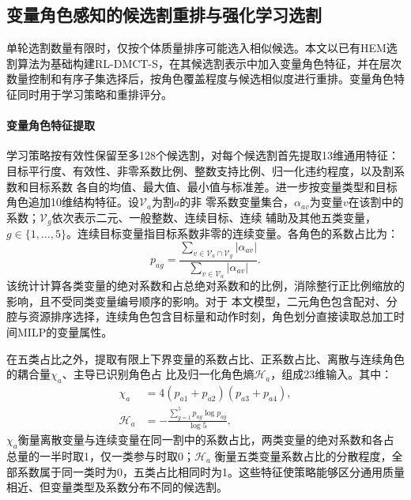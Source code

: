 \documentclass[final,5p,times,twocolumn]{elsarticle}
\begin{document}
\subsection{变量角色感知的候选割重排与强化学习选割}
\label{sec:hem-extension-cn}

单轮选割数量有限时，仅按个体质量排序可能选入相似候选。本文以已有HEM选割算法\citep{wang2023hem}为基础构建RL-DMCT-S，在其候选割表示中加入变量角色特征，并在层次数量控制和有序子集选择后，按角色覆盖程度与候选相似度进行重排。变量角色特征同时用于学习策略和重排评分。

\paragraph{变量角色特征提取}
学习策略按有效性保留至多128个候选割，对每个候选割首先提取13维通用特征：目标平行度、有效性、非零系数比例、整数支持比例、归一化违约程度，以及割系数和目标系数
各自的均值、最大值、最小值与标准差。进一步按变量类型和目标角色追加10维结构特征。设$\mathcal V_a$为割$a$的非
零系数变量集合，$\alpha_{av}$为变量$v$在该割中的系数；$\mathcal V_g$依次表示二元、一般整数、连续目标、连续
辅助及其他五类变量，$g\in\{1,\ldots,5\}$。连续目标变量指目标系数非零的连续变量。各角色的系数占比为：
\begin{equation}
p_{ag}=\frac{\sum_{v\in\mathcal V_a\cap\mathcal V_g}|\alpha_{av}|}
{\sum_{v\in\mathcal V_a}|\alpha_{av}|}.
\label{eq:role-profile-cn}
\end{equation}
该统计计算各类变量的绝对系数和占总绝对系数和的比例，消除整行正比例缩放的影响，且不受同类变量编号顺序的影响。对于
本文模型，二元角色包含配对、分腔与资源排序选择，连续角色包含目标量和动作时刻，角色划分直接读取总加工时间MILP的变量属性。

在五类占比之外，提取有限上下界变量的系数占比、正系数占比、离散与连续角色的耦合量$\chi_a$、主导已识别角色占
比及归一化角色熵$\mathcal H_a$，组成23维输入。其中：
\begin{equation}
\begin{aligned}
\chi_a&=4(p_{a1}+p_{a2})(p_{a3}+p_{a4}),\\
\mathcal H_a&=-\frac{\sum_{g=1}^{5}p_{ag}\log p_{ag}}{\log5}.
\end{aligned}
\label{eq:role-information-cn}
\end{equation}
$\chi_a$衡量离散变量与连续变量在同一割中的系数占比，两类变量的绝对系数和各占总量的一半时取1，仅一类参与时取0；$\mathcal H_a$
衡量五类变量系数占比的分散程度，全部系数属于同一类时为0，五类占比相同时为1。这些特征使策略能够区分通用质量相近、但变量类型及系数分布不同的候选割。
\end{document}
